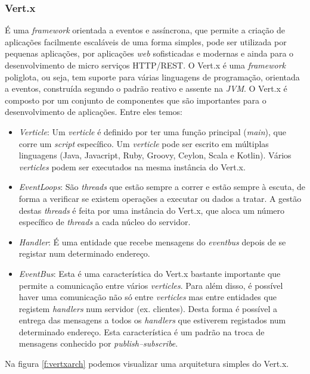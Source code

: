 \subsubsection{Vert.x}
É uma \textit{framework} orientada a eventos e assíncrona, que permite a criação de aplicações facilmente escaláveis de uma forma simples, pode ser utilizada por pequenas aplicações, por aplicações \textit{web} sofisticadas e modernas e ainda para o desenvolvimento de micro serviços \gls{HTTP}/\gls{REST}\cite{vertx-io}.
O Vert.x é uma \textit{framework} poliglota, ou seja, tem suporte para várias linguagens de programação, orientada a eventos, construída segundo o padrão reativo e assente na \textit{\gls{JVM}}. 
O Vert.x é composto por um conjunto de componentes que são importantes para o desenvolvimento de aplicações. Entre eles temos: 
\begin{itemize}
  \item \textit{Verticle}: Um \textit{verticle} é definido por ter uma função principal (\textit{main}), que corre um \textit{script} específico. Um \textit{verticle} pode ser escrito em múltiplas linguagens (Java, Javacript, Ruby, Groovy, Ceylon, Scala e Kotlin). Vários \textit{verticles} podem ser executados na mesma instância do Vert.x.
  \item \textit{EventLoops}: São \textit{threads} que estão sempre a correr e estão sempre à escuta, de forma a verificar se existem operações a executar ou dados a tratar. A gestão destas \textit{threads} é feita por uma instância do Vert.x, que aloca um número específico de \textit{threads} a cada núcleo do servidor.
  \item \textit{Handler}: É uma entidade que recebe mensagens do \textit{eventbus} depois de se registar num determinado endereço.
  \item \textit{EventBus}: Esta é uma característica do Vert.x bastante importante que permite a comunicação entre vários \textit{verticles}. Para além disso, é possível haver uma comunicação não só entre \textit{verticles} mas entre entidades que registem \textit{handlers} num servidor (ex. clientes). Desta forma é possível a entrega das mensagens a todos os \textit{handlers} que estiverem registados num determinado endereço. Esta característica é um padrão na troca de mensagens conhecido por \textit{publish–subscribe}.
\end{itemize}
Na figura \ref{f:vertxarch} podemos visualizar uma arquitetura simples do Vert.x. \cite{vertx-study}

